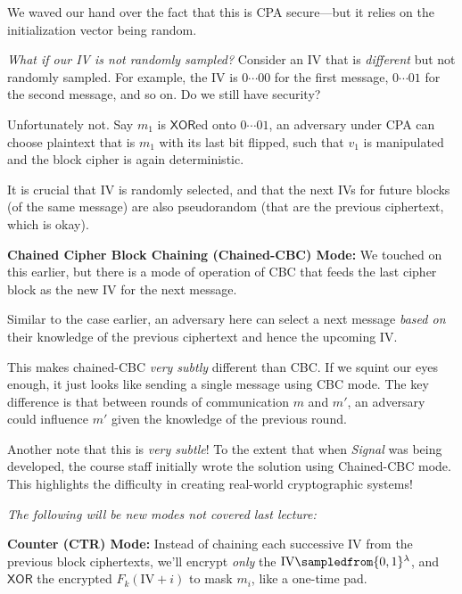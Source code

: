 
We waved our hand over the fact that this is CPA secure---but it relies on the initialization vector being random.

\emph{What if our IV is not randomly sampled?} Consider an IV that is \emph{different} but not randomly sampled. For example, the IV is $0\cdots 00$ for the first message, $0\cdots 01$ for the second message, and so on. Do we still have security?

Unfortunately not. Say $m_1$ is $\mathsf{XOR}$ed onto $0\cdots 01$, an adversary under CPA can choose plaintext that is $m_1$ with its last bit flipped, such that $v_1$ is manipulated and the block cipher is again deterministic.

It is crucial that IV is randomly selected, and that the next IVs for future blocks (of the same message) are also pseudorandom (that are the previous ciphertext, which is okay).

\textbf{Chained Cipher Block Chaining (Chained-CBC) Mode:} We touched on this earlier, but there is a mode of operation of CBC that feeds the last cipher block as the new IV for the next message.


Similar to the case earlier, an adversary here can select a next message \emph{based on} their knowledge of the previous ciphertext and hence the upcoming IV.

This makes chained-CBC \emph{very subtly} different than CBC. If we squint our eyes enough, it just looks like sending a single message using CBC mode. The key difference is that between rounds of communication $m$ and $m'$, an adversary could influence $m'$ given the knowledge of the previous round.

\begin{remark*}
    Another note that this is \emph{very subtle}! To the extent that when \emph{Signal} was being developed, the course staff initially wrote the solution using Chained-CBC mode. This highlights the difficulty in creating real-world cryptographic systems!
\end{remark*}

\emph{The following will be new modes not covered last lecture:}

\textbf{Counter (CTR) Mode:} Instead of chaining each successive IV from the previous block ciphertexts, we'll encrypt \emph{only} the $\mathrm{IV}\sampledfrom \{0, 1\}^\lambda$, and $\mathsf{XOR}$ the encrypted $F_k(\mathrm{IV}+i)$ to mask $m_i$, like a one-time pad.

